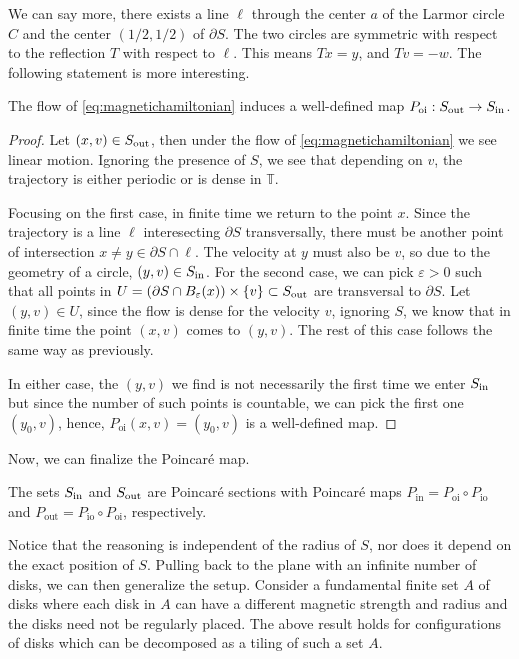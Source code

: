 We can say more, there exists a line $\ell$ through the center $a$ of the Larmor circle $C$ and the center $(1/2,1/2)$ of $\partial S$. The two circles are symmetric with respect to the reflection $T$ with respect to $\ell$. This means $Tx=y$, and $Tv = -w$. The following statement is more interesting.

\begin{lemma}\label{lem:SoutToSin}
The flow of \eqref{eq:magnetichamiltonian} induces a well-defined map $P_\text{oi}:S_\text{out}\to S_\text{in}$.
\end{lemma}
\begin{proof}
Let $(x,v)\in S_\text{out}$, then under the flow of \eqref{eq:magnetichamiltonian} we see linear motion. Ignoring the presence of $S$, we see that depending on $v$, the trajectory is either periodic or is dense in $\mathbb T$.

Focusing on the first case, in finite time we return to the point $x$. Since the trajectory is a line $\ell$ interesecting $\partial S$ transversally, there must be another point of intersection $x\neq y\in\partial S\cap\ell$. The velocity at $y$ must also be $v$, so due to the geometry of a circle, $(y,v)\in S_\text{in}$. For the second case, we can pick $\varepsilon>0$ such that all points in $U=(\partial S\cap B_\varepsilon(x))\times\{v\}\subset S_\text{out}$ are transversal to $\partial S$. Let $(y,v)\in U$, since the flow is dense for the velocity $v$, ignoring $S$, we know that in finite time the point $(x,v)$ comes to $(y,v)$. The rest of this case follows the same way as previously. 

In either case, the $(y,v)$ we find is not necessarily the first time we enter $S_\text{in}$ but since the number of such points is countable, we can pick the first one $(y_0,v)$, hence, $P_\text{oi}(x,v) = (y_0,v)$ is a well-defined map.
\end{proof}

Now, we can finalize the Poincar\'e map.

\begin{proposition}
The sets $S_\text{in}$ and $S_\text{out}$ are Poincar\'e sections with Poincar\'e maps $P_\text{in} = P_\text{oi}\circ P_\text{io}$ and $P_\text{out}= P_\text{io}\circ P_\text{oi}$, respectively.
\end{proposition}

Notice that the reasoning is independent of the radius of $S$, nor does it depend on the exact position of $S$. Pulling back to the plane with an infinite number of disks, we can then generalize the setup. Consider a fundamental finite set $A$ of disks where each disk in $A$ can have a different magnetic strength and radius and the disks need not be regularly placed. The above result holds for configurations of disks which can be decomposed as a tiling of such a set $A$.

